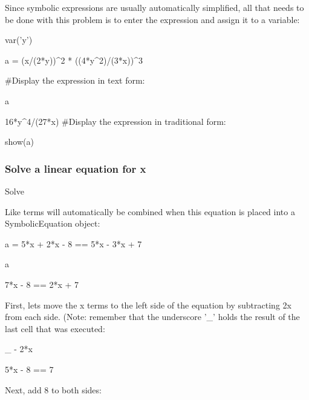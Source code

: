 \documentclass[12pt,oneside]{book}
\begin{document}
{\textquotedbl}{\textquotedbl}{\textquotedbl}

Since symbolic expressions are usually automatically simplified, all that needs to be done with this problem is to enter the expression and assign it to a variable:

{\textquotedbl}{\textquotedbl}{\textquotedbl}


var('y')

a = (x/(2*y))\^{}2 * ((4*y\^{}2)/(3*x))\^{}3


\#Display the expression in text form:

a

{\textbar}

16*y\^{}4/(27*x)
\#Display the expression in traditional form:

show(a)

{\textbar}

 

 


\subsubsection[Solve a linear equation for x]{Solve a linear equation for x}

Solve 


{\textquotedbl}{\textquotedbl}{\textquotedbl}

Like terms will automatically be combined when this equation is placed into a SymbolicEquation object:

{\textquotedbl}{\textquotedbl}{\textquotedbl}

a = 5*x + 2*x {}- 8 == 5*x {}- 3*x + 7

a

{\textbar}

7*x {}- 8 == 2*x + 7

{\textquotedbl}{\textquotedbl}{\textquotedbl}

First, lets move the x terms to the left side of the equation by subtracting 2x from each side. (Note: remember that the underscore '\_' holds the result of the last cell that was executed:

{\textquotedbl}{\textquotedbl}{\textquotedbl}

\_ {}- 2*x

{\textbar}

5*x {}- 8 == 7

{\textquotedbl}{\textquotedbl}{\textquotedbl}

Next, add 8 to both sides:

{\textquotedbl}{\textquotedbl}{\textquotedbl}
\end{document}
